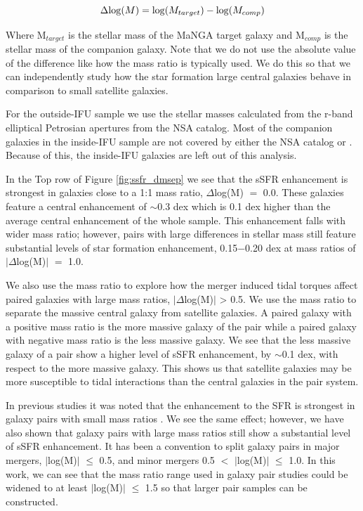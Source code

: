\documentclass[iop,revtex4,twocolumn,apj,numberedappendix,appendixfloats]{emulateapj}
\begin{document}
\begin{equation}
\Delta {\rm log}(M) = {\rm log}(M_{target}) - {\rm log}(M_{comp}) 
\end{equation}

Where M$_{target}$ is the stellar mass of the MaNGA target galaxy and M$_{comp}$ is the stellar mass of the companion galaxy. Note that we do not use the absolute value of the difference like how the mass ratio is typically used. We do this so that we can independently study how the star formation large central galaxies behave in comparison to small satellite galaxies.

For the outside-IFU sample we use the stellar masses calculated from the r-band elliptical Petrosian apertures from the NSA catalog. Most of the companion galaxies in the inside-IFU sample are not covered by either the NSA catalog or \citet{Simard:2011}. Because of this, the inside-IFU galaxies are left out of this analysis.

In the Top row of Figure \ref{fig:ssfr_dmsep} we see that the sSFR enhancement is strongest in galaxies close to a 1:1 mass ratio, $\Delta$log(M) $=$ 0.0. These galaxies feature a central enhancement of $\sim$0.3 dex which is 0.1 dex higher than the average central enhancement of the whole sample. This enhancement falls with wider mass ratio; however, pairs with large differences in stellar mass still feature substantial levels of star formation enhancement, 0.15$-$0.20 dex at mass ratios of $|\Delta$log(M)$|$ $=$ 1.0.

We also use the mass ratio to explore how the merger induced tidal torques affect paired galaxies with large mass ratios, $|\Delta$log(M)$|$ > 0.5. We use the mass ratio to separate the massive central galaxy from satellite galaxies. A paired galaxy with a positive mass ratio is the more massive galaxy of the pair while a paired galaxy with negative mass ratio is the less massive galaxy. We see that the less massive galaxy of a pair show a higher level of sSFR enhancement, by $\sim$0.1 dex, with respect to the more massive galaxy. This shows us that satellite galaxies may be more susceptible to tidal interactions than the central galaxies in the pair system. 

In previous studies it was noted that the enhancement to the SFR is strongest in galaxy pairs with small mass ratios \citet{Ellison:2008}. We see the same effect; however, we have also shown that galaxy pairs with large mass ratios still show a substantial level of sSFR enhancement. It has been a convention to split galaxy pairs in major mergers, $|$log(M)$|$ $\le$ 0.5, and minor mergers 0.5 $<$ $|$log(M)$|$ $\le$ 1.0. In this work, we can see that the mass ratio range used in galaxy pair studies could be widened to at least $|$log(M)$|$ $\le$ 1.5 so that larger pair samples can be constructed.  
\end{document}

